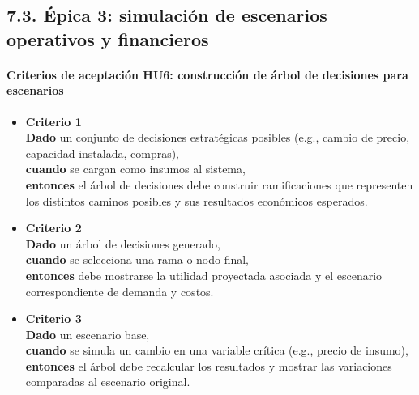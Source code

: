 \documentclass[
11pt, %
]{charter}
\begin{document}
\subsection*{7.3. Épica 3: simulación de escenarios operativos y financieros}

\paragraph{Criterios de aceptación HU6: construcción de árbol de decisiones para escenarios}
\begin{itemize}
  \item \textbf{Criterio 1} \\
  \textbf{Dado} un conjunto de decisiones estratégicas posibles (e.g., cambio de precio, capacidad instalada, compras), \\
  \textbf{cuando} se cargan como insumos al sistema, \\
  \textbf{entonces} el árbol de decisiones debe construir ramificaciones que representen los distintos caminos posibles y sus resultados económicos esperados.

  \item \textbf{Criterio 2} \\
  \textbf{Dado} un árbol de decisiones generado, \\
  \textbf{cuando} se selecciona una rama o nodo final, \\
  \textbf{entonces} debe mostrarse la utilidad proyectada asociada y el escenario correspondiente de demanda y costos.

  \item \textbf{Criterio 3} \\
  \textbf{Dado} un escenario base, \\
  \textbf{cuando} se simula un cambio en una variable crítica (e.g., precio de insumo), \\
  \textbf{entonces} el árbol debe recalcular los resultados y mostrar las variaciones comparadas al escenario original.
\end{itemize}

\vspace{1em}
\end{document}

